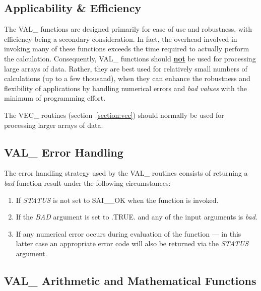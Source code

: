 \documentclass[11pt,nolof]{starlink}
\providecommand{\name}[1]{#1}
\providecommand{\fortvar}[1]{\emph{#1}}
\begin{document}
\subsection{Applicability \& Efficiency}

The \name{VAL\_} functions are designed primarily for ease of use and
robustness, with efficiency being a secondary consideration.
In fact, the
overhead involved in invoking many of these functions exceeds the time
required to actually perform the calculation.
Consequently, \name{VAL\_} functions should \textbf{\underline{not}} be used
for processing large arrays of data.
Rather, they are best used for relatively small numbers of calculations (up
to a few thousand), when they can enhance the robustness and flexibility of
applications by handling numerical errors and \emph{bad values} with the
minimum of programming effort.

The \name{VEC\_} routines (section~\ref{section:vec}) should normally be
used for processing larger arrays of data.

\subsection{\name{VAL\_} Error Handling}
\label{section:val:error}

The error handling strategy used by the \name{VAL\_} routines consists of
returning a \emph{bad} function result under the following circumstances:

\begin{enumerate}

\item If \fortvar{STATUS} is not set to \name{SAI\_\_OK} when the function
is invoked.

\item If the \fortvar{BAD} argument is set to \name{.TRUE.} and any of
the input arguments is \emph{bad}.

\item If any numerical error occurs during evaluation of the function --- in
this latter case an appropriate error code will also be returned via the
\fortvar{STATUS} argument.

\end{enumerate}

\subsection{\name{VAL\_} Arithmetic and Mathematical Functions}
\end{document}
